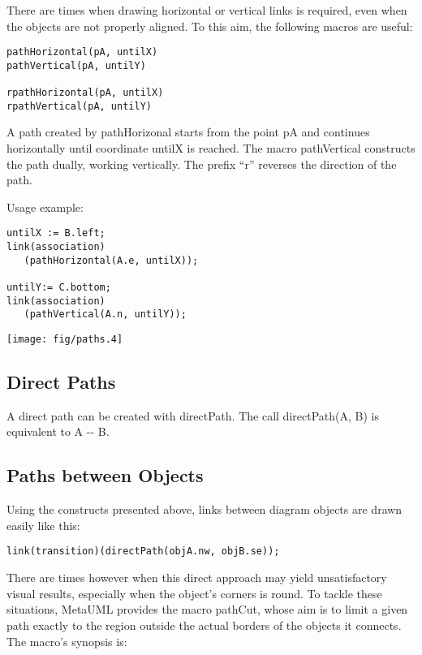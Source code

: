 \documentclass{article}
\newcommand{\code}{\ttfamily}
\begin{document}
There are times when drawing horizontal or vertical links is required,
even when the objects are not properly aligned. To this aim, the following macros
are useful:

\begin{verbatim}
pathHorizontal(pA, untilX)
pathVertical(pA, untilY)

rpathHorizontal(pA, untilX)
rpathVertical(pA, untilY)
\end{verbatim}

A path created by {\code pathHorizonal} starts from the point {\code pA}
and continues horizontally until coordinate {\code untilX} is reached. The macro
{\code pathVertical} constructs the path dually, working vertically.
The prefix ``{\code r}'' reverses the direction of the path.

Usage example:

\begin{multicols}{2}
\begin{verbatim}
untilX := B.left;
link(association)
   (pathHorizontal(A.e, untilX));

untilY:= C.bottom;
link(association)
   (pathVertical(A.n, untilY));
\end{verbatim}
\columnbreak
\hspace{1cm}\texttt{[image: fig/paths.4]}
\end{multicols}

\subsection{Direct Paths}

A direct path can be created with {\code directPath}. The call {\code directPath(A, B)}
is equivalent to {\code A -{}-  B}.

\subsection{Paths between Objects}

Using the constructs presented above, links between diagram objects are drawn easily like this:

\begin{verbatim}
link(transition)(directPath(objA.nw, objB.se));
\end{verbatim}

There are times however when this direct approach may yield unsatisfactory visual results,
especially when the object's corners is round. To tackle these situations, MetaUML provides the macro
{\code pathCut}, whose aim is to limit a given path exactly to the region outside the actual
borders of the objects it connects. The macro's synopsis is:
\end{document}
